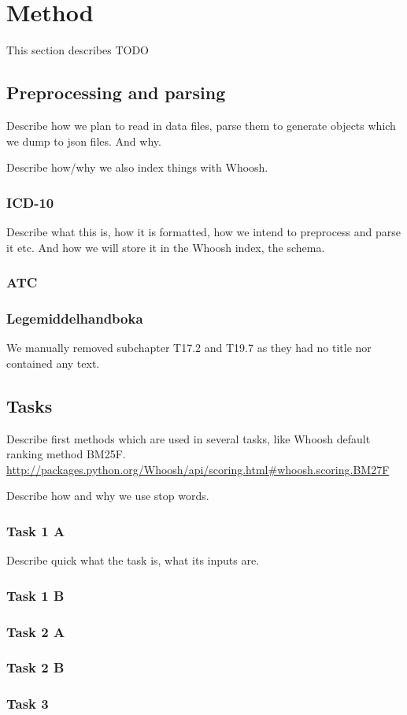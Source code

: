 \chapter{Method}
This section describes TODO


\section{Preprocessing and parsing}
Describe how we plan to read in data files, parse them to generate objects
which we dump to json files. And why.

Describe how/why we also index things with Whoosh.

\subsection{ICD-10}
Describe what this is, how it is formatted, how we intend to preprocess and
parse it etc. And how we will store it in the Whoosh index, the schema.

\subsection{ATC}

\subsection{Legemiddelhandboka} %
We manually removed subchapter T17.2 and T19.7 as they had no title nor
contained any text.


\section{Tasks}
Describe first methods which are used in several tasks, like Whoosh default
ranking method BM25F.
\url{http://packages.python.org/Whoosh/api/scoring.html#whoosh.scoring.BM27F}

Describe how and why we use stop words.

\subsection{Task 1 A}
Describe quick what the task is, what its inputs are.

\subsection{Task 1 B}

\subsection{Task 2 A}

\subsection{Task 2 B}

\subsection{Task 3}


